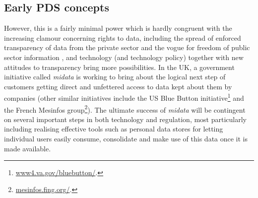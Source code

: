 \documentclass{acm_proc_article-sp}
\begin{document}




% 
\subsection{Early PDS concepts}

However, this is a fairly minimal power which is hardly congruent with the increasing clamour concerning rights to data, including the spread of enforced transparency of data from the private sector \cite{fung2007} and the vogue for freedom of public sector information \cite{ohara2014}, and technology (and technology policy) together with new attitudes to transparency bring more possibilities. In the UK, a government initiative called \emph{midata} \cite{midata} is working to bring about the logical next step of customers getting direct and unfettered access to data kept about them by companies (other similar initiatives include the US Blue Button initiative\footnote{\url{www4.va.gov/bluebutton/}.} and the French Mesinfos group\footnote{\url{mesinfos.fing.org/}.}). The ultimate success of \emph{midata} will be contingent on several important steps in both technology and regulation, most particularly including realising effective tools such as personal data stores for letting individual users easily consume, consolidate and make use of this data once it is made available.
\end{document}

